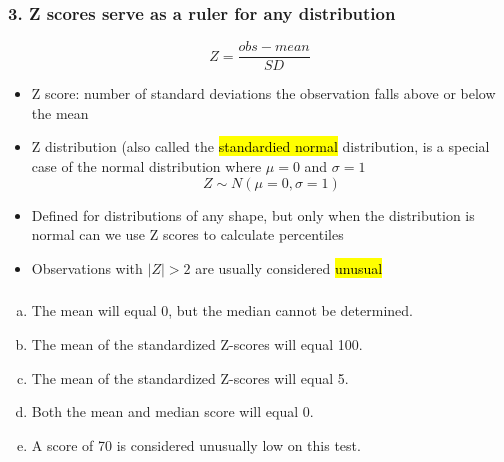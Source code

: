\documentclass[11pt,containsverbatim,handout,xcolor=xelatex,dvipsnames,table]{beamer}
\newcommand{\solnMult}[1]{#1}
\begin{document}

\begin{frame}
\frametitle{3. Z scores serve as a ruler for any distribution}

\[ Z = \frac{obs - mean}{SD} \]

\begin{itemize}

\item Z score: number of standard deviations the observation falls above or below the mean

\pause

\item Z distribution (also called the \hl{standardied normal} distribution, is a special case 
of the normal distribution where $\mu = 0$ and $\sigma = 1$
\[ Z \sim N(\mu = 0, \sigma = 1) \]

\pause

\item Defined for distributions of any shape, but only when the distribution is normal can we use 
Z scores to calculate percentiles

\pause

\item Observations with $|Z| > 2$ are usually considered \hl{unusual}

\end{itemize}

\end{frame}


\begin{frame}
\frametitle{}


\begin{enumerate}[(a)]
\item The mean will equal 0, but the median cannot be determined.
\item The mean of the standardized Z-scores will equal 100.
\item The mean of the standardized Z-scores will equal 5.
\item \solnMult{Both the mean and median score will equal 0.}
\item A score of 70 is considered unusually low on this test.
\end{enumerate}

\end{frame}
\end{document}
